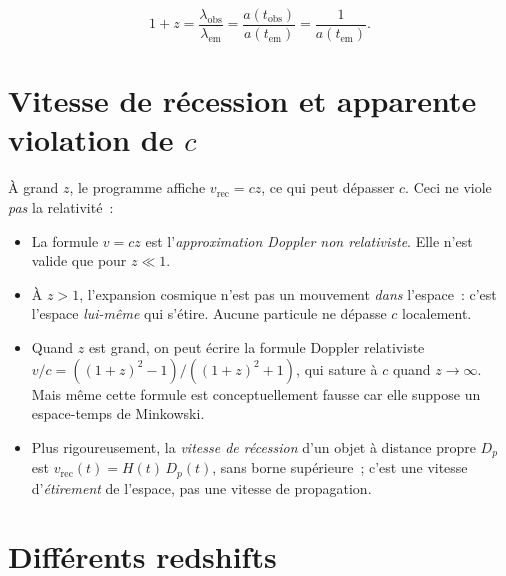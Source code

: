 \documentclass[11pt,a4paper,openany]{report}
\begin{document}
\begin{equation}
\boxed{\;1 + z = \frac{\lambda_{\text{obs}}}{\lambda_{\text{em}}}
                = \frac{a(t_{\text{obs}})}{a(t_{\text{em}})}
                = \frac{1}{a(t_{\text{em}})}.\;}
\label{eq:z_FLRW}
\end{equation}

\section{Vitesse de récession et apparente violation de $c$}
\label{sec:vitesse_rec}

\begin{tcolorbox}[attention]
À grand $z$, le programme affiche $v_{\text{rec}} = cz$, ce qui peut dépasser
$c$. Ceci ne viole \emph{pas} la relativité~:
\begin{itemize}[topsep=2pt]
\item La formule $v=cz$ est l'\emph{approximation Doppler non relativiste}.
  Elle n'est valide que pour $z\ll 1$.
\item À $z>1$, l'expansion cosmique n'est pas un mouvement \emph{dans}
  l'espace~: c'est l'espace \emph{lui-même} qui s'étire. Aucune particule ne
  dépasse $c$ localement.
\item Quand $z$ est grand, on peut écrire la formule Doppler relativiste
  $v/c = ((1+z)^{2}-1)/((1+z)^{2}+1)$, qui sature à $c$ quand $z\to\infty$.
  Mais même cette formule est conceptuellement fausse car elle suppose un
  espace-temps de Minkowski.
\item Plus rigoureusement, la \emph{vitesse de récession} d'un objet à
  distance propre $D_p$ est $v_{\text{rec}}(t) = H(t)\,D_p(t)$, sans
  borne supérieure~; c'est une vitesse d'\emph{étirement} de l'espace, pas
  une vitesse de propagation.
\end{itemize}
\end{tcolorbox}

\section{Différents redshifts}
\end{document}
